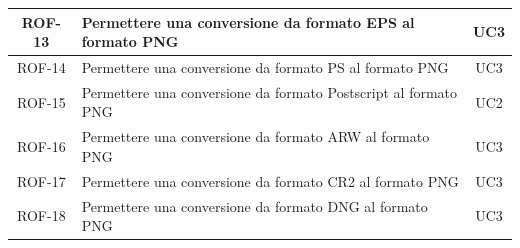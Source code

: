 \begin{table}[H]
\begin{tabularx}{\textwidth}{|c|X|c|}
        \\
        \hline
        ROF-13             & Permettere una conversione da formato EPS al formato PNG        & UC3
        \\
        \hline
        ROF-14             & Permettere una conversione da formato PS al formato PNG         & UC3
        \\
        \hline
        ROF-15             & Permettere una conversione da formato Postscript al formato PNG
                           & UC2
        \\
        \hline
        ROF-16             & Permettere una conversione da formato ARW al formato PNG        & UC3
        \\
        \hline
        ROF-17             & Permettere una conversione da formato CR2 al formato PNG        & UC3
        \\
        \hline
        ROF-18             & Permettere una conversione da formato DNG al formato PNG        & UC3
        \\
        \hline
    \end{tabularx}
\end{table}%
\newpage
